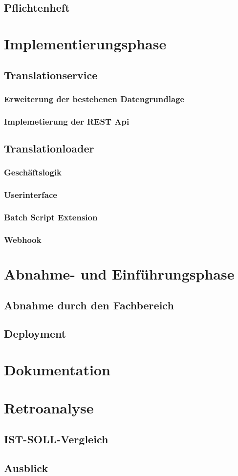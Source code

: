 \documentclass[12pt,oneside]{article}
\begin{document}
  \subsection{Pflichtenheft}
  \section{Implementierungsphase}
  \subsection{Translationservice}
  \subsubsection{Erweiterung der bestehenen Datengrundlage}
  \subsubsection{Implemetierung der REST Api}
  \subsection{Translationloader}
  \subsubsection{Geschäftslogik}
  \subsubsection{Userinterface}
  \subsubsection{Batch Script Extension}
  \subsubsection{Webhook}
  \section{Abnahme- und Einführungsphase}
  \subsection{Abnahme durch den Fachbereich}
  \subsection{Deployment}
  \section{Dokumentation}
  \section{Retroanalyse}
  \subsection{IST-SOLL-Vergleich}
  \subsection{Ausblick}
\end{document}
